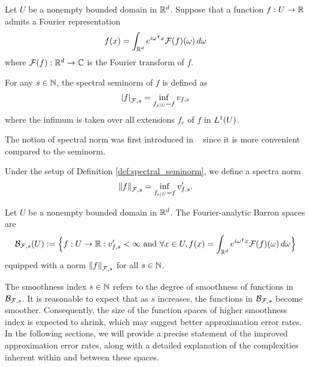 \begin{definition}
    \label{def:spectral_seminorm}
    Let $U$ be a nonempty bounded domain in $\mathbb{R}^d$. Suppose that a function $f:
    U \to \mathbb{R}$ admits a Fourier representation
    \begin{equation}
        f(x) = \int_{\mathbb{R}^d} e^{i\omega{}^{\intercal} x} \mathcal{F}(f)(\omega) \,d\omega
    \end{equation}
    where $\mathcal{F}(f): \mathbb{R}^d \to \mathbb{C}$ is the Fourier transform of $f$.

    For any $s \in \mathbb{N}$, the spectral seminorm of $f$ is defined as
    \begin{equation}
        \left| f \right|_{\mathcal{F}, {s}} = \inf_{f_{e\mid U} = f} v_{f,s}
    \end{equation}
    where the infimum is taken over all extensions $f_e$ of $f$ in $L^{1}(U)$.
\end{definition}


The notion of spectral norm was first introduced in
~\cite{siegelApproximationRatesNeural2021} since it is more convenient compared
to the seminorm.

\begin{definition}
    \label{def:spectral_norm}
    Under the setup of Definition \ref{def:spectral_seminorm}, we define a
    spectra norm
    \begin{equation}
        \left\| f \right\|_{\mathcal{F}, {s}} = \inf_{f_{e\mid U} = f} v'_{f,s}.
    \end{equation}
\end{definition}

\begin{definition}
    \label{def:fourier_space}
    Let $U$ be a nonempty bounded domain in $\mathbb{R}^d$. The Fourier-analytic Barron
    spaces are
    \begin{equation}
        \mathcal{B}_{\mathcal{F},s}(U) := \Big\{
            f: U \to \mathbb{R}: v'_{f,s} < \infty  \textnormal{ and }
            \forall x\in U, 
                f(x) = \int_{\mathbb{R}^d} e^{i\omega{}^{\intercal} x} \mathcal{F}(f)(\omega)\,d\omega
        \Big\}
    \end{equation}
    equipped with a norm $\left\| f \right\|_{\mathcal{F}, {s}}$ for all $s \in \mathbb{N}$.
\end{definition}



The smoothness index $s \in \mathbb{N}$ refers to the degree of smoothness of
functions in $\mathcal{B}_{\mathcal{F}, s}$. It is reasonable to expect that as $s$
increases, the functions in $\mathcal{B}_{\mathcal{F}, s}$ become smoother.
Consequently, the size of the function spaces of higher smoothness index is
expected to shrink, which may suggest better approximation error rates. In the
following sections, we will provide a precise statement of the improved
approximation error rates, along with a detailed explanation of the complexities
inherent within and between these spaces.

